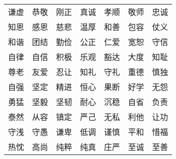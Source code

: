 \begin{table}[h]
    \centering
    \begin{tabular}{ccccccc}
        谦虚 & 恭敬 & 刚正 & 真诚 & 孝顺 & 敬师 & 忠诚 \\
        知恩 & 感恩 & 慈悲 & 温厚 & 和善 & 包容 & 仗义 \\
        和谐 & 团结 & 勤俭 & 公正 & 仁爱 & 宽恕 & 守信 \\
        自律 & 自信 & 积极 & 乐观 & 豁达 & 大度 & 知耻 \\
        尊老 & 友爱 & 忍让 & 知礼 & 守礼 & 重德 & 慎独 \\
        自强 & 坚定 & 精进 & 恒心 & 果断 & 好学 & 无怨 \\
        勇猛 & 坚毅 & 坚韧 & 耐心 & 沉稳 & 自省 & 负责 \\
        泰然 & 从容 & 镇定 & 严己 & 无私 & 利他 & 让功 \\
        守浅 & 守愚 & 谦卑 & 低调 & 谨慎 & 平和 & 惜福 \\
        热忱 & 高尚 & 纯粹 & 纯真 & 庄严 & 至诚 & 至善 \\
    \end{tabular}
\end{table}

